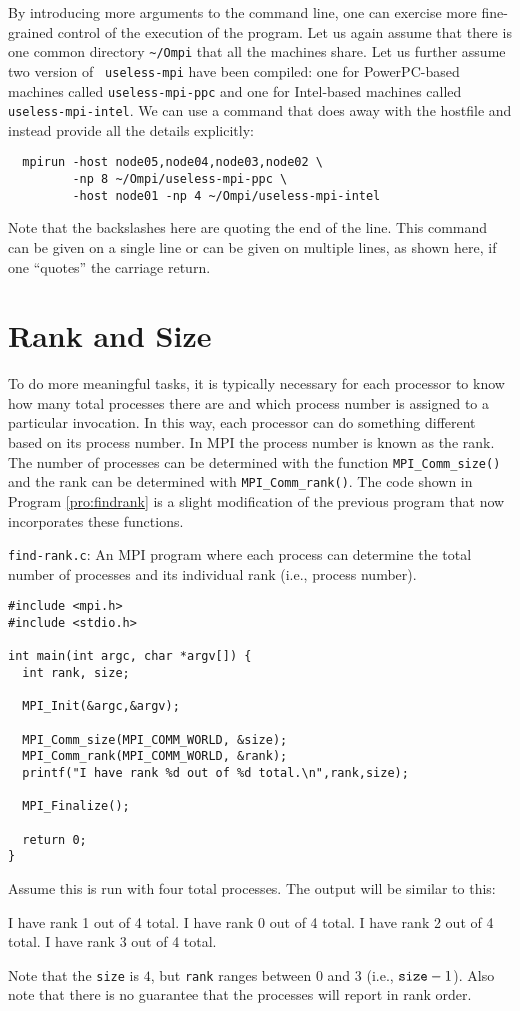 By introducing more arguments to the command line, one can exercise more
fine-grained control of the execution of the program.  Let us again
assume that there is one common directory \verb+~/Ompi+ that all the
machines share.  Let us further assume two version of {\tt
  useless-mpi} have been compiled: one for PowerPC-based machines
called {\tt useless-mpi-ppc} and one for Intel-based machines called
{\tt useless-mpi-intel}.  We can use a command that does away with the
hostfile and instead provide all the details explicitly:
\begin{verbatim}
  mpirun -host node05,node04,node03,node02 \
         -np 8 ~/Ompi/useless-mpi-ppc \
         -host node01 -np 4 ~/Ompi/useless-mpi-intel
\end{verbatim}
Note that the backslashes here are quoting the end of the line.  This
command can be given on a single line or can be given on multiple
lines, as shown here, if one ``quotes'' the carriage return.

\section{Rank and Size}

To do more meaningful tasks, it is typically necessary for each
processor to know how many total processes there are and which process
number is assigned to a particular invocation.  In this way, each
processor can do something different based on its process number.  In
MPI the process number is known as the rank.  The number of processes
can be determined with the function {\tt MPI\_Comm\_size()} and the
rank can be determined with {\tt MPI\_Comm\_rank()}.  The code shown
in Program \ref{pro:findrank} is a slight modification of the previous
program that now incorporates these functions.

\begin{program}
{\tt find-rank.c}: An MPI program where each process can determine the
total number of processes and its individual rank (i.e., process
number).  \label{pro:findrank}
\codemiddle
\begin{lstlisting}
#include <mpi.h>
#include <stdio.h>

int main(int argc, char *argv[]) {
  int rank, size;

  MPI_Init(&argc,&argv);

  MPI_Comm_size(MPI_COMM_WORLD, &size);
  MPI_Comm_rank(MPI_COMM_WORLD, &rank);
  printf("I have rank %d out of %d total.\n",rank,size);

  MPI_Finalize();

  return 0;
}
\end{lstlisting}
\end{program}
Assume this is run with four total processes.  The output will be
similar to this:
\begin{code}
  I have rank 1 out of 4 total.
  I have rank 0 out of 4 total.
  I have rank 2 out of 4 total.
  I have rank 3 out of 4 total.
\end{code}
Note that the {\tt size} is $4$, but {\tt rank} ranges between $0$ and
$3$ (i.e., ${\tt size}-1$).  Also note that there is no guarantee that
the processes will report in rank order.

